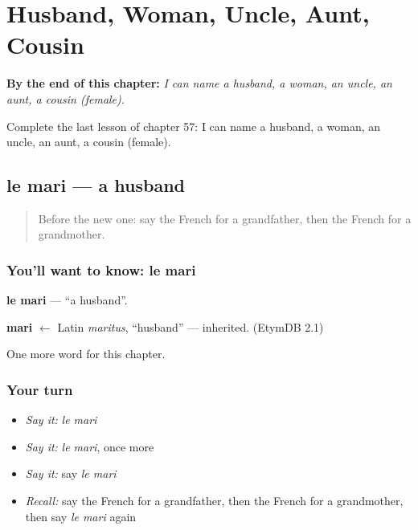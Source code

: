 
\chapter{Husband, Woman, Uncle, Aunt, Cousin}
\label{ch:fr-husband-woman-uncle-aunt-cousin}

\begin{chapteropening}
\textbf{By the end of this chapter:} \emph{I can name a husband, a woman, an uncle, an aunt, a cousin (female).}

Complete the last lesson of chapter 57: I can name a husband, a woman, an uncle, an aunt, a cousin (female).
\end{chapteropening}

\section[le mari]{le mari — a husband}

\label{lesson:FR-C57-mari}



\begin{quote}
Before the new one: say the French for a grandfather, then the French for a grandmother.
\end{quote}

\subsection*{You'll want to know: le mari}
\textbf{le mari} — \textquotedblleft{}a husband\textquotedblright{}.

\begin{cousinweb}
\textbf{mari} $\leftarrow$ Latin \emph{maritus}, \textquotedblleft{}husband\textquotedblright{} — inherited. (EtymDB 2.1)
\end{cousinweb}

\begin{grammarlens}[title={What you've built}]
One more word for this chapter.
\end{grammarlens}

\subsection*{Your turn}
\begin{itemize}
\raggedright
  \item \emph{Say it:} \emph{le mari}
  \item \emph{Say it:} \emph{le mari}, once more
  \item \emph{Say it:} say \emph{le mari}
  \item \emph{Recall:} say the French for a grandfather, then the French for a grandmother, then say \emph{le mari} again
\end{itemize}

